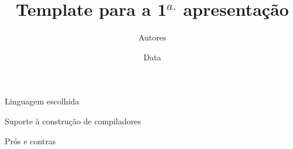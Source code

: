 \documentclass{beamer}
\title[Compiladores 2017.2]{Template para a 1$^{a.}$ apresentação}
\author[Abrev.]{Autores}
\institute[UFF]{Universidade Federal Fluminense}
\date{Data}
\begin{document}

\begin{frame}[plain]

\titlepage

\end{frame}


\begin{frame}{Linguagem escolhida}

\end{frame}


\begin{frame}{Suporte à construção de compiladores}

\end{frame}


\begin{frame}{Prós e contras}

\end{frame}
\end{document}
